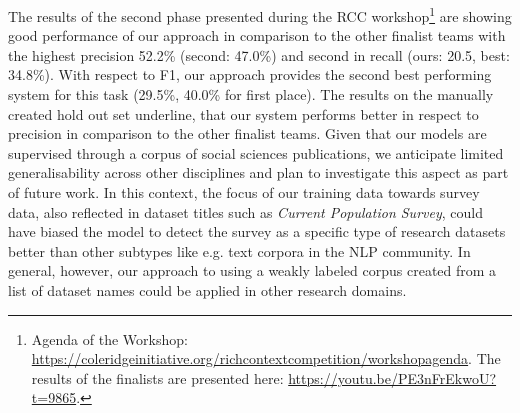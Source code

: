 The results of the second phase presented during the RCC workshop\footnote{
    Agenda of the Workshop: 
    \url{https://coleridgeinitiative.org/richcontextcompetition/workshopagenda}.
    The results of the finalists are presented here: 
    \url{https://youtu.be/PE3nFrEkwoU?t=9865}.
}
are showing good performance of our approach in comparison to the other finalist teams with the highest precision 52.2\% (second: 47.0\%) and second in recall (ours: 20.5, best: 34.8\%).
With respect to F1, our approach provides the second best performing system for this task (29.5\%, 40.0\% for first place).
The results on the manually created hold out set underline, that our system performs better in respect to precision in comparison to the other finalist teams.
Given that our models are supervised through a corpus of social sciences publications, we anticipate limited generalisability across other disciplines and plan to investigate this aspect as part of future work. In this context, the focus of our training data towards survey data, also reflected in dataset titles such as \textit{Current Population Survey}, could have biased the model to detect the survey as a specific type of research datasets better than other subtypes like e.g. text corpora in the NLP community.
In general, however, our approach to using a weakly labeled corpus created from a list of dataset names could be applied in other research domains.
\begin{comment}
* limitations\
**    Performance is difficult to measure\\
**    Ground truth needed to have a good measure\\
**    During development a ground truth holdout set would have prevented the feeling to fish in troubled waters.\\
\end{comment}

